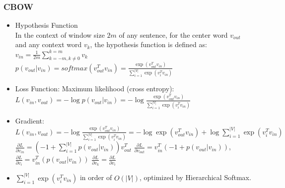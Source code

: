 \begin{frame}
\frametitle{CBOW}
	\small
	\begin{itemize}
		\item Hypothesis Function \\
			In the context of window size $2m$ of any sentence, for the center word $v_{out}$ and any context word $v_{k}$,
			the hypothesis function is defined as:
			\\\hspace{1cm}$v_{in}=\frac{1}{2m}\sum_{k=-m, k\neq 0}^{k=m}v_{k}$
			\\\hspace{1cm}$p(v_{out}|v_{in})=softmax(v_{out}^Tv_{in})=\frac{\exp(v_{out}^Tv_{in})}{\sum_{i=1}^{|V|}\exp(v_i^Tv_{in})}$
		\item Loss Function: 
			Maximum likelihood (cross entropy):
			\\$L(v_{in},v_{out})=-\log p(v_{out}|v_{in})
				=-\log \frac{\exp(v_{out}^Tv_{in})}{\sum_{i=1}^{|V|}\exp(v_i^Tv_{in})}$
		\item Gradient:
			\\$L(v_{in},v_{out})=-\log\frac{\exp(v_{out}^Tv_{in})}{\sum_{i=1}^{|V|}\exp(v_i^Tv_{in})}=-\log\exp(v_{out}^Tv_{in}) + \log\sum_{i=1}^{|V|}\exp(v_i^Tv_{in})$ 
		\\ \hspace{0.5cm}$\frac{\partial{L}}{\partial{v_{in}}}=(-1+\sum_{i=1}^{|V|}p(v_{out}|v_{in}))v_{out}^T$
		 \hspace{0.5cm}$\frac{\partial{L}}{\partial{v_{out}}}=v_{in}^T(-1+p(v_{out}|v_{in}))$,
		\\\hspace{0.5cm}$\frac{\partial{L}}{\partial{v_{i}}}=v_{in}^T(p(v_{out}|v_{in}))$
		\hspace{2.5cm}$\frac{\partial{L}}{\partial{v_{k}}}=\frac{\partial{L}}{\partial{v_{i}}}$
		\item $\sum_{i=1}^{|V|}\exp(v_i^Tv_{in})$ in order of $O(|V|)$, optimized by Hierarchical Softmax.
	\end{itemize}
\end{frame}
